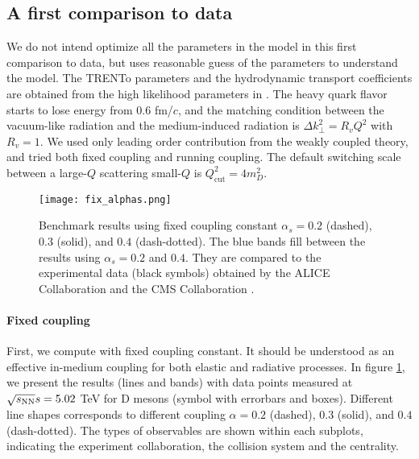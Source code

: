 \subsection{A first comparison to data}
We do not intend optimize all the parameters in the model in this first comparison to data, but uses reasonable guess of the parameters to understand the model.
The TRENTo parameters and the hydrodynamic transport coefficients are obtained from the high likelihood parameters in \cite{Bernhard:2018hnz}.
The heavy quark flavor starts to lose energy from $0.6$ fm/$c$, and the matching condition between the vacuum-like radiation and the medium-induced radiation is $\Delta k_\perp^2 = R_v Q^2$ with $R_v = 1$.
We used only leading order contribution from the weakly coupled theory, and tried both fixed coupling and running coupling.
The default switching scale between a large-$Q$ scattering small-$Q$ is $Q_{\textrm{cut}}^2 = 4 m_D^2$.

\begin{figure}
\centering
\texttt{[image: fix\_alphas.png]}
\caption{Benchmark results using fixed coupling constant $\alpha_s = 0.2$ (dashed), $0.3$ (solid), and $0.4$ (dash-dotted). The blue bands fill between the results using $\alpha_s=0.2$ and $0.4$. They are compared to the experimental data (black symbols) obtained by the ALICE Collaboration \cite{Acharya:2017qps,Acharya:2018hre} and the CMS Collaboration \cite{Sirunyan:2017xss,Sirunyan:2017plt}.}
\label{fig:new:fix-a}
\end{figure}

\paragraph{Fixed coupling} First, we compute with fixed coupling constant.
It should be understood as an effective in-medium coupling for both elastic and radiative processes.
In figure \ref{fig:new:fix-a}, we present the results (lines and bands) with data points measured at $\sqrt{s_\mathrm{NN}}{s} = 5.02$ TeV for D mesons (symbol with errorbars and boxes).
Different line shapes corresponds to different coupling $\alpha=0.2$ (dashed), $0.3$ (solid), and $0.4$ (dash-dotted). 
The types of observables are shown within each subplots, indicating the experiment collaboration, the collision system and the centrality.

